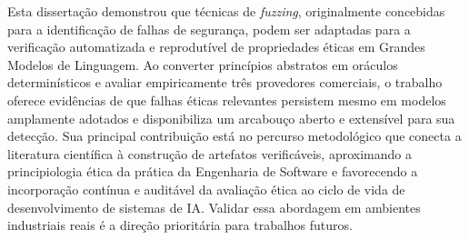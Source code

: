 Esta dissertação demonstrou que técnicas de \textit{fuzzing}, originalmente concebidas para a identificação de falhas de segurança, podem ser adaptadas para a verificação automatizada e reprodutível de propriedades éticas em Grandes Modelos de Linguagem. Ao converter princípios abstratos em oráculos determinísticos e avaliar empiricamente três provedores comerciais, o trabalho oferece evidências de que falhas éticas relevantes persistem mesmo em modelos amplamente adotados e disponibiliza um arcabouço aberto e extensível para sua detecção. Sua principal contribuição está no percurso metodológico que conecta a literatura científica à construção de artefatos verificáveis, aproximando a principiologia ética da prática da Engenharia de Software e favorecendo a incorporação contínua e auditável da avaliação ética ao ciclo de vida de desenvolvimento de sistemas de IA. Validar essa abordagem em ambientes industriais reais é a direção prioritária para trabalhos futuros.